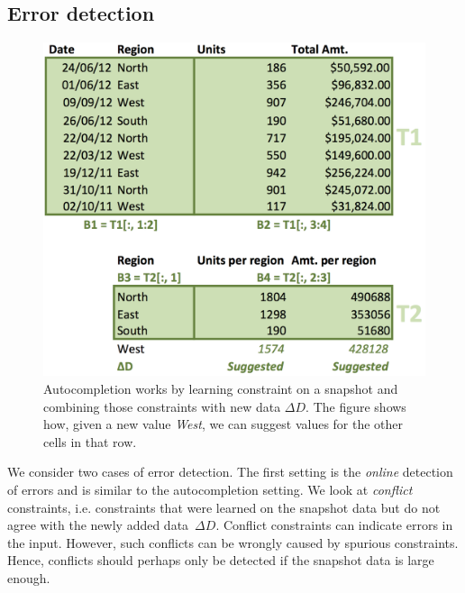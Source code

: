 \documentclass{IEEEtran}
\theoremstyle{definition}
\begin{document}
\subsection{Error detection}
\begin{figure}[thb]
\begin{center}
    \includegraphics[width=0.65\linewidth]{figures/Learning.png}
  \end{center}
  \caption{Autocompletion works by learning constraint on a snapshot and combining those constraints with new data $\Delta D$.
  The figure shows how, given a new value \textit{West}, we can suggest values for the other cells in that row.}
  \label{fig:autocompletion_example}
\end{figure}

We consider two cases of error detection.
The first setting is the \textit{online} detection of errors and is similar to the autocompletion setting.
We look at \textit{conflict} constraints, i.e. constraints that were learned on the snapshot data but do not agree with the newly added data~$\Delta D$.
Conflict constraints can indicate errors in the input.
However, such conflicts can be wrongly caused by spurious constraints.
Hence, conflicts should perhaps only be detected if the snapshot data is large enough.
\end{document}
